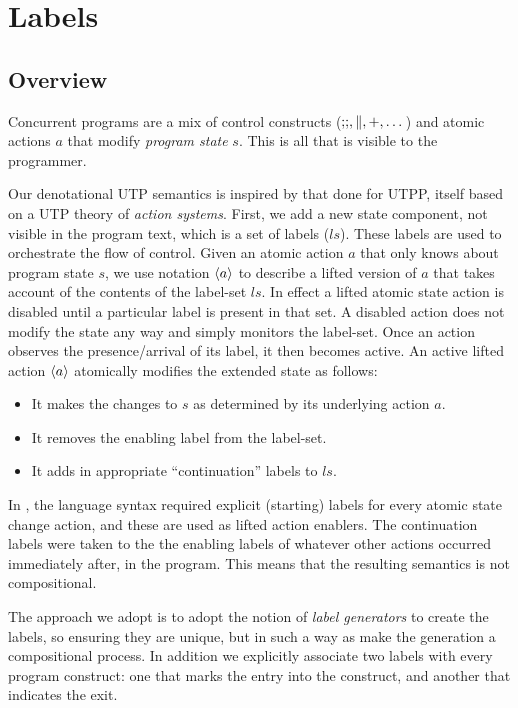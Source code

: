 \section{Labels}\label{sec:labels}

\subsection{Overview}


Concurrent programs are a mix of control constructs ($\mathbin{;\!;},\parallel,+,\dots$)
and atomic actions $a$ that modify \emph{program state} $s$.
This is all that is visible to the programmer.



Our denotational UTP semantics
is inspired by that done for UTPP\cite{DBLP:conf/icfem/WoodcockH02},
itself based on a UTP theory of \emph{action systems}.
First, we add a new state component, not visible in the program text,
which is a set of labels ($ls$).
These labels are used to orchestrate the flow of control.
Given an atomic action $a$ that only knows about program state $s$,
we use notation $\langle a\rangle$ to describe a lifted version
of $a$ that takes account of the contents of the label-set $ls$.
In effect a lifted atomic state action is disabled until
a particular label is present in that set.
A disabled action does not modify the state any way
and simply monitors the label-set.
Once an action observes the presence/arrival of its label,
it then becomes active.
An active lifted action $\langle a\rangle$ atomically modifies the extended state as follows:
\begin{itemize}
  \item It makes the changes to $s$ as determined by its underlying action $a$.
  \item It removes the enabling label from the label-set.
  \item It adds in appropriate ``continuation'' labels to $ls$.
\end{itemize}
In \cite{DBLP:conf/icfem/WoodcockH02},
the language syntax required explicit (starting) labels
for every atomic state change action,
and these are used as lifted action enablers.
The continuation labels were taken to the the enabling labels
of whatever other actions occurred immediately after, in the program.
This means that the resulting semantics is not compositional.

The approach we adopt is to adopt the notion of \emph{label generators}
to create the labels, so ensuring they are unique,
but in such a way as make the generation a compositional process.
In addition we explicitly associate two labels with every program construct:
one that marks the entry into the construct,
and another that indicates the exit.

